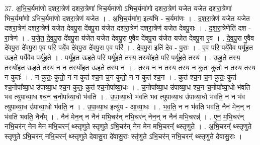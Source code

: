 \documentclass[17pt]{extarticle}
\begin{document}
37. अ॒भि॒च॒र्यमा॑णो दशरा॒त्रेण॑ दशरा॒त्रेणा॑ भिच॒र्यमा॑णो ऽभिच॒र्यमा॑णो दशरा॒त्रेण॑ यजेत यजेत दशरा॒त्रेणा॑ भिच॒र्यमा॑णो ऽभिच॒र्यमा॑णो दशरा॒त्रेण॑ यजेत । . अ॒भि॒च॒र्यमा॑ण॒ इत्य॑भि - च॒र्यमा॑णः । . द॒श॒रा॒त्रेण॑ यजेत यजेत दशरा॒त्रेण॑ दशरा॒त्रेण॑ यजेत देवपु॒रा दे॑वपु॒रा य॑जेत दशरा॒त्रेण॑ दशरा॒त्रेण॑ यजेत देवपु॒राः । . द॒श॒रा॒त्रेणेति॑ दश - रा॒त्रेण॑ । . य॒जे॒त॒ दे॒व॒पु॒रा दे॑वपु॒रा य॑जेत यजेत देवपु॒रा ए॒वैव दे॑वपु॒रा य॑जेत यजेत देवपु॒रा ए॒व । . दे॒व॒पु॒रा ए॒वैव दे॑वपु॒रा दे॑वपु॒रा ए॒व परि॒ पर्ये॒व दे॑वपु॒रा दे॑वपु॒रा ए॒व परि॑ । . दे॒व॒पु॒रा इति॑ देव - पु॒राः । . ए॒व परि॒ पर्ये॒वैव पर्यू॑हत ऊहते॒ पर्ये॒वैव पर्यू॑हते । . पर्यू॑हत ऊहते॒ परि॒ पर्यू॑हते॒ तस्य॒ तस्यो॑हते॒ परि॒ पर्यू॑हते॒ तस्य॑ । . ऊ॒ह॒ते॒ तस्य॒ तस्यो॑हत ऊहते॒ तस्य॒ न न तस्यो॑हत ऊहते॒ तस्य॒ न । . तस्य॒ न न तस्य॒ तस्य॒ न कुतः॒ कुतो॒ न तस्य॒ तस्य॒ न कुतः॑ । . न कुतः॒ कुतो॒ न न कुत॑ श्च॒न च॒न कुतो॒ न न कुत॑ श्च॒न । . कुत॑ श्च॒न च॒न कुतः॒ कुत॑ श्च॒नोपा᳚व्या॒ध उ॑पाव्या॒ध श्च॒न कुतः॒ कुत॑ श्च॒नोपा᳚व्या॒धः । . च॒नोपा᳚व्या॒ध उ॑पाव्या॒ध श्च॒न च॒नोपा᳚व्या॒धो भ॑वति भव त्युपाव्या॒ध श्च॒न च॒नोपा᳚व्या॒धो भ॑वति । . उ॒पा॒व्या॒धो भ॑वति भव त्युपाव्या॒ध उ॑पाव्या॒धो भ॑वति॒ न न भ॑व त्युपाव्या॒ध उ॑पाव्या॒धो भ॑वति॒ न । . उ॒पा॒व्या॒ध इत्यु॑प - आ॒व्या॒धः । . भ॒व॒ति॒ न न भ॑वति भवति॒ नैन॑ मेन॒न् न भ॑वति भवति॒ नैन᳚म् । . नैन॑ मेन॒न् न नैन॑ मभि॒चर॑न् नभि॒चर॑न् नेन॒न् न नैन॑ मभि॒चरन्न्॑ । . ए॒न॒ म॒भि॒चर॑न् नभि॒चर॑न् नेन मेन मभि॒चरन्᳚ थ्स्तृणुते स्तृणुते ऽभि॒चर॑न् नेन मेन मभि॒चरन्᳚ थ्स्तृणुते । . अ॒भि॒चरन्᳚ थ्स्तृणुते स्तृणुते ऽभि॒चर॑न् नभि॒चरन्᳚ थ्स्तृणुते देवासु॒रा दे॑वासु॒राः स्तृ॑णुते ऽभि॒चर॑न् नभि॒चरन्᳚ थ्स्तृणुते देवासु॒राः । \newline
\end{document}
